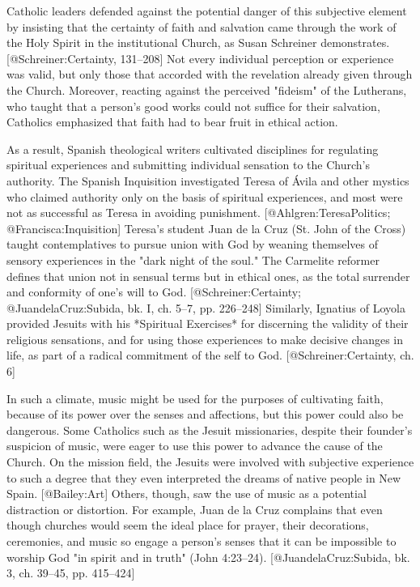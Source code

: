 Catholic leaders defended against the potential danger of this subjective
element by insisting that the certainty of faith and salvation came through the
work of the Holy Spirit in the institutional Church, as Susan Schreiner
demonstrates. 
[@Schreiner:Certainty, 131--208]
Not every individual perception or experience was valid, but only those that
accorded with the revelation already given through the Church. 
Moreover, reacting against the perceived "fideism" of the Lutherans,
who taught that a person's good works could not suffice for their salvation,
Catholics emphasized that faith had to bear fruit in ethical action.

As a result, Spanish theological writers cultivated disciplines for regulating
spiritual experiences and submitting individual sensation to the Church's
authority. 
The Spanish Inquisition investigated Teresa of Ávila and other mystics who
claimed authority only on the basis of spiritual experiences, and most were not
as successful as Teresa in avoiding punishment.
[@Ahlgren:TeresaPolitics; @Francisca:Inquisition]
Teresa's student Juan de la Cruz (St. John of the Cross) taught contemplatives
to pursue union with God by weaning themselves of sensory experiences in the
"dark night of the soul." 
The Carmelite reformer defines that union not in sensual terms but in ethical
ones, as the total surrender and conformity of one's will to God.
[@Schreiner:Certainty; @JuandelaCruz:Subida, bk. I, ch. 5--7, pp. 226--248]
Similarly, Ignatius of Loyola provided Jesuits with his *Spiritual Exercises*
for discerning the validity of their religious sensations, and for using those
experiences to make decisive changes in life, as part of a radical commitment of
the self to God. 
[@Schreiner:Certainty, ch. 6]

In such a climate, music might be used for the purposes of cultivating faith,
because of its power over the senses and affections, but this power could also
be dangerous.
Some Catholics such as the Jesuit missionaries, despite their founder's
suspicion of music, were eager to use this power to advance the cause of the
Church. 
On the mission field, the Jesuits were involved with subjective experience to
such a degree that they even interpreted the dreams of native people in New
Spain. 
[@Bailey:Art]
Others, though, saw the use of music as a potential distraction or distortion. 
For example, Juan de la Cruz complains that even though churches would seem the
ideal place for prayer, their decorations, ceremonies, and music so engage a
person's senses that it can be impossible to worship God "in spirit and in
truth" (John 4:23--24). 
[@JuandelaCruz:Subida, bk. 3, ch. 39--45, pp. 415--424]


